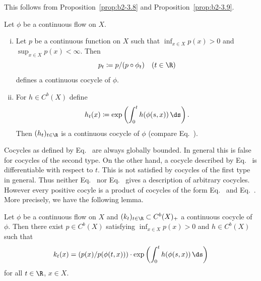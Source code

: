 This follows from Proposition~\ref{prop:b2-3.8} and Proposition~\ref{prop:b2-3.9}.

\begin{example}\label{ex:b2-3.11}
Let $\phi$ be a continuous flow on $X$.
\begin{enumerate}[(i), wide, labelindent=.25em]
\item \label{ex:b2-3.11-1}
Let $p$ be a continuous function on $X$ such that $\inf_{x \in X} p(x) > 0$ and $\sup_{x \in X} p(x) < \infty$.
Then
\begin{equation}\label{eq:b2-3.13}
p_{t} \coloneqq p/(p \circ \phi_{t}) \quad (t \in \R)
\end{equation}
defines a continuous cocycle of\/ $\phi$.
\item \label{ex:b2-3.11-2}
For $h \in C^{b}(X)$ define
\begin{equation}\label{eq:b2-3.14}
h_{t}(x) \coloneqq \exp\left(\int_{0}^{t} h(\phi(s,x))\, \ds \right).
\end{equation}
Then $(h_{t})_{t \in \R}$ is a continuous cocycle of\/ $\phi$ (compare Eq.~).
\end{enumerate}
\end{example}

Cocycles as defined by Eq.~ are always globally bounded.
In general this is false for cocycles of the second type.
On the other hand, a cocycle described by Eq.~ is differentiable with respect to $t$.
This is not satisfied by cocycles of the first type in general.
Thus neither Eq.~ nor Eq.~ gives a description of arbitrary cocycles.
However every positive cocyle is a product of cocycles of the form Eq.~ and Eq.~.
More precisely, we have the following lemma.

\begin{lemma}\label{lem:b2-3.12}
Let $\phi$ be a continuous flow on $X$ and $(k_{t})_{t \in \R} \subset C^{b}(X)_{+}$ a continuous cocycle of\/ $\phi$.
Then there exist $p \in C^{b}(X)$ satisfying $\inf_{x \in X} p(x) > 0$ and $h \in C^{b}(X)$ such that
\begin{equation}\label{eq:b2-3.15}
k_{t}(x) = (p(x)/p(\phi(t,x))) \cdot \exp\left(\int_{0}^{t} h(\phi(s,x))\, \ds\right)
\end{equation}
for all $t \in \R$, $x \in X$.
\end{lemma}

